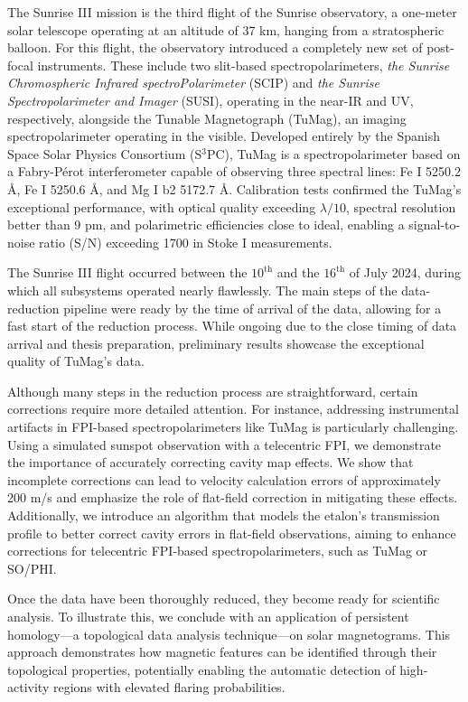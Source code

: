\documentclass[12pt]{mythesis}
\begin{document}
The Sunrise III mission is the third flight of the Sunrise observatory, a one-meter solar telescope operating at an altitude of 37 km, hanging from a stratospheric balloon. For this flight, the observatory introduced a completely new set of post-focal instruments. These include two slit-based spectropolarimeters, \textit{the Sunrise Chromospheric Infrared spectroPolarimeter} (SCIP) and \textit{the Sunrise Spectropolarimeter and Imager} (SUSI), operating in the near-IR and UV, respectively, alongside the Tunable Magnetograph (TuMag), an imaging spectropolarimeter operating in the visible. Developed entirely by the Spanish Space Solar Physics Consortium (S$^3$PC), TuMag is a spectropolarimeter based on a Fabry-Pérot interferometer capable of observing three spectral lines: Fe I 5250.2 Å, Fe I 5250.6 Å, and Mg I b2 5172.7 Å. Calibration tests confirmed the TuMag’s exceptional performance, with optical quality exceeding $\lambda/10$, spectral resolution better than 9 pm, and polarimetric efficiencies close to ideal, enabling a signal-to-noise ratio (S/N) exceeding 1700 in Stoke I measurements.

The Sunrise III flight occurred between the $10^{\text{th}}$ and the $16^{\text{th}}$ of July 2024, during which all subsystems operated nearly flawlessly. The main steps of the data-reduction pipeline were ready by the time of arrival of the data, allowing for a fast start of the reduction process. While ongoing due to the close timing of data arrival and thesis preparation, preliminary results showcase the exceptional quality of TuMag’s data.

Although many steps in the reduction process are straightforward, certain corrections require more detailed attention. For instance, addressing instrumental artifacts in FPI-based spectropolarimeters like TuMag is particularly challenging. Using a simulated sunspot observation with a telecentric FPI, we demonstrate the importance of accurately correcting cavity map effects. We show that incomplete corrections can lead to velocity calculation errors of approximately 200 m/s and emphasize the role of flat-field correction in mitigating these effects. Additionally, we introduce an algorithm that models the etalon's transmission profile to better correct cavity errors in flat-field observations, aiming to enhance corrections for telecentric FPI-based spectropolarimeters, such as TuMag or SO/PHI.

Once the data have been thoroughly reduced, they become ready for scientific analysis. To illustrate this, we conclude with an application of persistent homology—a topological data analysis technique—on solar magnetograms. This approach demonstrates how magnetic features can be identified through their topological properties, potentially enabling the automatic detection of high-activity regions with elevated flaring probabilities.
\end{document}
